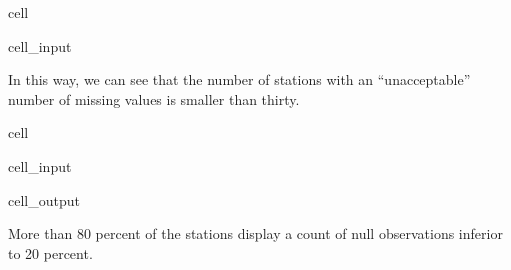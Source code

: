 \documentclass[letterpaper,10pt,english]{jupyterBook}
\begin{document}
\begin{sphinxuseclass}{cell}
\begin{sphinxuseclass}{cell_input}
\begin{sphinxVerbatim}[commandchars=\\\{\}]
\PYG{p}{[}\PYG{p}{]}  
    \PYG{p}{[}\PYG{p}{]}  
\end{sphinxVerbatim}

\end{sphinxuseclass}
\end{sphinxuseclass}
\sphinxAtStartPar
In this way, we can see that the number of stations with an “unacceptable” number of missing values is smaller than thirty.

\begin{sphinxuseclass}{cell}
\begin{sphinxuseclass}{cell_input}
\begin{sphinxVerbatim}[commandchars=\\\{\}]
 

 


\end{sphinxVerbatim}

\end{sphinxuseclass}
\begin{sphinxuseclass}{cell_output}
\noindent{}

\end{sphinxuseclass}
\end{sphinxuseclass}
\sphinxAtStartPar
More than 80 percent of the stations display a count of null observations inferior to 20 percent.
\end{document}
